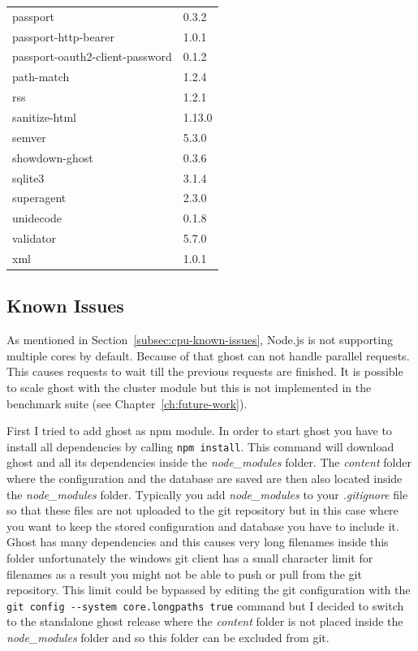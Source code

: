\begin{longtable}{ll}
		passport & 0.3.2 \\
		passport-http-bearer & 1.0.1 \\
		passport-oauth2-client-password & 0.1.2 \\
		path-match & 1.2.4 \\
		rss & 1.2.1 \\
		sanitize-html & 1.13.0 \\
		semver & 5.3.0 \\
		showdown-ghost & 0.3.6 \\
		sqlite3 & 3.1.4 \\
		superagent & 2.3.0 \\
		unidecode & 0.1.8 \\
		validator & 5.7.0 \\
		xml & 1.0.1 \\
	\end{longtable} 	
	
	\subsection{Known Issues}
	As mentioned in Section~\ref{subsec:cpu-known-issues}, Node.js is not supporting multiple cores by default. Because of that ghost can not handle parallel requests. This causes requests to wait till the previous requests are finished. It is possible to scale ghost with the cluster module but this is not implemented in the benchmark suite (see Chapter~\ref{ch:future-work})\cite{ghost-cluster}\cite{nodejs-cluster}.
	
	
	First I tried to add ghost as npm module\cite{ghost-module}. In order to start ghost you have to install all dependencies by calling \texttt{npm install}. This command will download ghost and  all its dependencies inside the \textit{node\_modules} folder. The \textit{content} folder where the configuration and the database are saved are then also located inside the \textit{node\_modules} folder. Typically you add \textit{node\_modules} to your \textit{.gitignore} file so that these files are not uploaded to the git repository but in this case where you want to keep the stored configuration and database you have to include it. Ghost has many dependencies and this causes very long filenames inside this folder unfortunately the windows git client has a small character limit for filenames as a result you might not be able to push or pull from the git repository. This limit could be bypassed by editing the git configuration with the \texttt{git config -{}-system core.longpaths true} command but I decided to switch to the standalone ghost release where the \textit{content} folder is not placed inside the \textit{node\_modules} folder and so this folder can be excluded from git.
